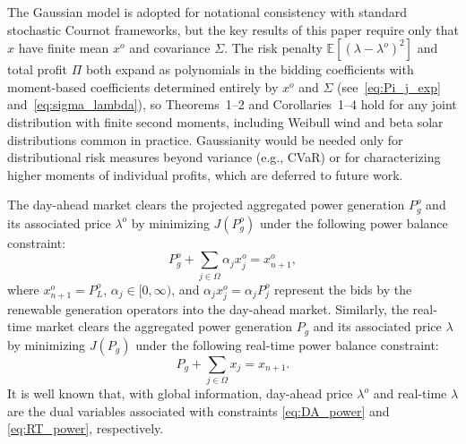 \documentclass[journal]{IEEEtran}
\begin{document}
The Gaussian model is adopted for notational consistency with standard stochastic Cournot frameworks, but the key results of this paper require only that $x$ have finite mean $x^o$ and covariance $\Sigma$. The risk penalty $\mathbb{E}[(\lambda-\lambda^o)^2]$ and total profit $\Pi$ both expand as polynomials in the bidding coefficients with moment-based coefficients determined entirely by $x^o$ and $\Sigma$ (see~\eqref{eq:Pi_j_exp} and~\eqref{eq:sigma_lambda}), so Theorems~1--2 and Corollaries~1--4 hold for any joint distribution with finite second moments, including Weibull wind and beta solar distributions common in practice. Gaussianity would be needed only for distributional risk measures beyond variance (e.g., CVaR) or for characterizing higher moments of individual profits, which are deferred to future work.

The day-ahead market clears the projected aggregated power generation $P_g^o$ and its associated price $\lambda^o$ by minimizing $J(P_g^o)$ under the following power balance constraint:
\begin{equation} 
P_g^o + \sum_{j\in\Omega} \alpha_j x_j^o  = x_{n+1}^o, \label{eq:DA_power}
\end{equation}
where $x_{n+1}^o=P_L^o$, $\alpha_j\in[0,\infty)$, and $\alpha_j x_j^o =\alpha_j P_j^o$ represent the bids by the renewable generation operators into the day-ahead market. Similarly, the real-time market clears the aggregated power generation $P_g$ and its associated price $\lambda$ by minimizing $J(P_g)$ under the following real-time power balance constraint:
\begin{equation} 
P_g + \sum_{j\in\Omega} x_j   = x_{n+1}. \label{eq:RT_power}
\end{equation}
It is well known that, with global information, day-ahead price $\lambda^o$ and real-time $\lambda$ are the dual variables associated with constraints \eqref{eq:DA_power} and \eqref{eq:RT_power}, respectively. 
\end{document}
